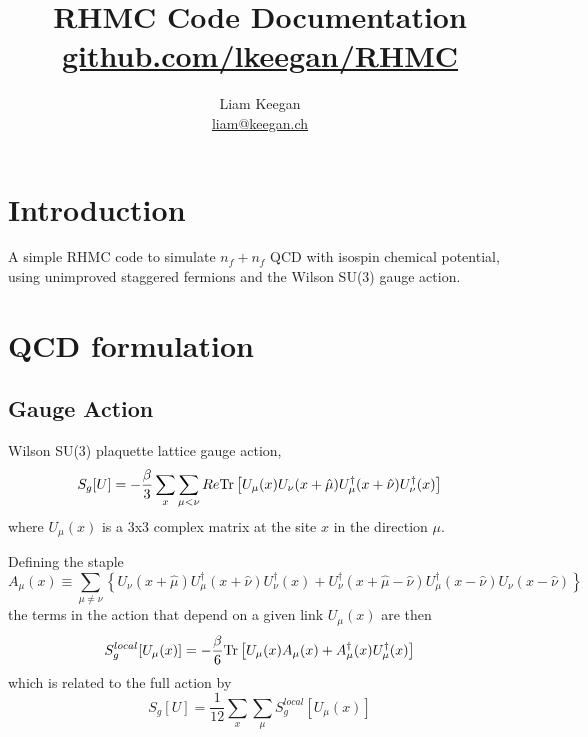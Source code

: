 \documentclass[a4paper,12pt]{article}
\newcommand{\Tr}{{\rm Tr}}
\begin{document}
\author{Liam Keegan\\ \href{mailto:liam@keegan.ch}{liam@keegan.ch}}
\title{RHMC Code Documentation \\ \href{https://github.com/lkeegan/RHMC}{github.com/lkeegan/RHMC}}

\maketitle

\section{Introduction}
A simple RHMC code to simulate $n_f+n_f$ QCD with isospin chemical potential, using unimproved staggered fermions and the Wilson SU(3) gauge action.

\section{QCD formulation}
\subsection{Gauge Action}
Wilson SU(3) plaquette lattice gauge action,
\begin{equation}
 S_g[U] = -\frac{\beta}{3} \sum_x \sum_{\mu<\nu} Re \Tr \left[ U_{\mu}(x)  U_{\nu}(x+\hat\mu)  U_{\mu}^{\dagger}(x+\hat\nu)  U_{\nu}^{\dagger}(x)\right]
\end{equation}
where $U_\mu(x)$ is a 3x3 complex matrix at the site $x$ in the direction $\mu$.

Defining the staple
\begin{equation}
 A_\mu(x) \equiv \sum_{\mu\neq\nu} \left\{
 U_{\nu}(x+\hat\mu) U_{\mu}^{\dagger}(x+\hat\nu)  U_{\nu}^{\dagger}(x) +
 U_{\nu}^{\dagger}(x+\hat\mu-\hat\nu) U_{\mu}^{\dagger}(x-\hat\nu)  U_{\nu}(x-\hat\nu) \right\}
\end{equation}
the terms in the action that depend on a given link $U_{\mu}(x)$ are then
\begin{equation}
 S_g^{local}[U_{\mu}(x)] = -\frac{\beta}{6} \Tr \left[ U_{\mu}(x) A_{\mu}(x) + A_{\mu}^{\dagger}(x)U_{\mu}^{\dagger}(x)  \right]
\end{equation}
which is related to the full action by
\begin{equation}
 S_g[U] = \frac{1}{12} \sum_{x} \sum_{\mu} S_g^{local}[U_{\mu}(x)]
\end{equation}
\end{document}

